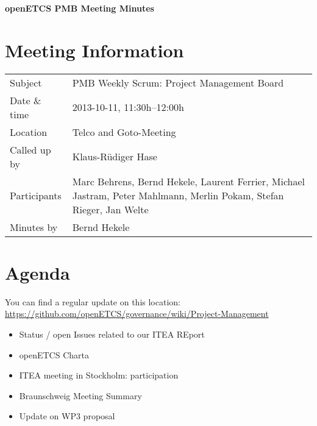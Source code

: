 \documentclass[a4paper, 11pt]{article}
\begin{document}
{\begin{center}\huge\bf openETCS PMB Meeting Minutes\end{center}}
\section{Meeting Information}

\renewcommand{\arraystretch}{1.5}
\begin{supertabular}{m{.2\textwidth}m{.8\textwidth}}
Subject & PMB Weekly Scrum: Project Management Board\\
Date \& time & 2013-10-11, 11:30h--12:00h\\
Location & Telco and Goto-Meeting\\
Called up by & Klaus-R\"udiger Hase\\
Participants &
Marc Behrens,
Bernd Hekele,
Laurent Ferrier,
Michael Jastram,
Peter Mahlmann,
Merlin Pokam,
Stefan Rieger,
Jan Welte
\\

Minutes by & Bernd Hekele\\

\end{supertabular}
\renewcommand{\arraystretch}{1.0}


\section{{Agenda}}
You can find a regular update on this location: \url{https://github.com/openETCS/governance/wiki/Project-Management}

\begin{itemize}
\item Status / open Issues related to our ITEA REport
\item openETCS Charta
\item ITEA meeting in Stockholm: participation
\item Braunschweig Meeting Summary
\item Update on WP3 proposal

\end{itemize}
\end{document}
